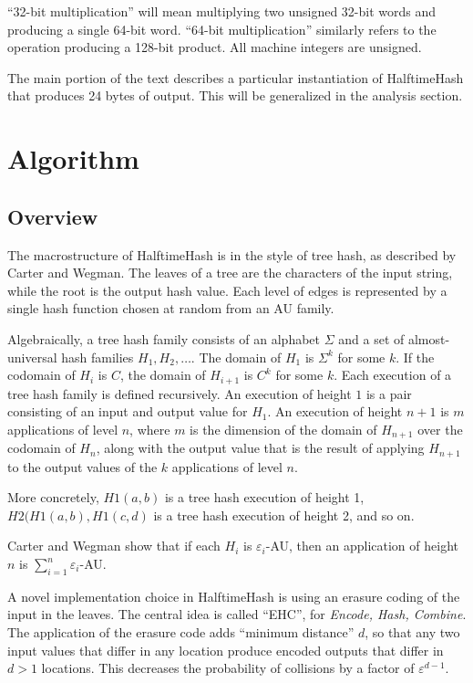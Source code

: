\documentclass[sigconf, nonacm]{acmart}
\begin{document}
``32-bit multiplication'' will mean multiplying two unsigned 32-bit words and producing a single 64-bit word.
``64-bit multiplication'' similarly refers to the operation producing a 128-bit product.
All machine integers are unsigned.

The main portion of the text describes a particular instantiation of HalftimeHash that produces 24 bytes of output.
This will be generalized in the analysis section.

\section{Algorithm}

\subsection{Overview}

The macrostructure of HalftimeHash is in the style of tree hash, as described by Carter and Wegman. \cite{carter-wegman-79}
The leaves of a tree are the characters of the input string, while the root is the output hash value.
Each level of edges is represented by a single hash function chosen at random from an AU family.

Algebraically, a tree hash family consists of an alphabet $\Sigma$ and a set of almost-universal hash families $H_1, H_2, \dots$.
The domain of $H_1$ is $\Sigma^k$ for some $k$.
If the codomain of $H_i$ is $C$, the domain of $H_{i+1}$ is $C^k$ for some $k$.
Each execution of a tree hash family is defined recursively.
An execution of height $1$ is a pair consisting of an input and output value for $H_1$.
An execution of height $n+1$ is $m$ applications of level $n$, where $m$ is the dimension of the domain of $H_{n+1}$ over the codomain of $H_n$, along with the output value that is the result of applying $H_{n+1}$ to the output values of the $k$ applications of level $n$.

More concretely, $H1(a,b)$ is a tree hash execution of height 1, $H2(H1(a,b), H1(c,d)$ is a tree hash execution of height 2, and so on.

Carter and Wegman show that if each $H_i$ is $\varepsilon_i$-AU, then an application of height $n$ is $\sum_{i=1}^n \varepsilon_i$-AU.

A novel implementation choice in HalftimeHash is using an erasure coding of the input in the leaves.
The central idea is called ``EHC'', for {\em Encode, Hash, Combine}. \cite{ehc-nandi}
The application of the erasure code adds ``minimum distance'' $d$, so that any two input values that differ in any location produce encoded outputs that differ in $d > 1$ locations.
This decreases the probability of collisions by a factor of $\varepsilon^{d-1}$.
\end{document}
